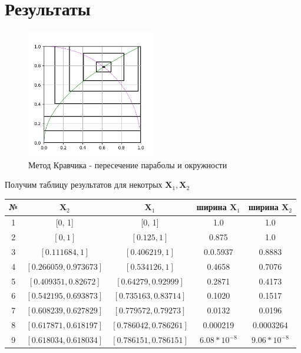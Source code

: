 \documentclass[a4paper,14pt]{article}
\begin{document}
	\section{Результаты}
	\begin{figure}[H] \label{MatrixCorrSet}
		\centering
		\includegraphics[width=0.5\textwidth]{g.png}
		\caption{Метод Кравчика - пересечение параболы и окружности} 
	\end{figure}
	
	Получим таблицу результатов для некотрых $\mathbf{X}_1, \mathbf{X}_2$
	\begin{table}[H]
		\begin{center}
			\begin{tabular}{|c|c|c|c|c|}
				\hline
				№ & $\mathbf{X}_2$ & $\mathbf{X}_1$ & ширина $\mathbf{X}_1$ &  ширина $\mathbf{X}_2$ \\
				\hline
				1   &[0, 1]  & [0, 1] & 1.0 & 1.0 \\
				2   &$[0, 1]$  & $[0.125, 1]$ & 0.875 & 1.0 \\
				3   &$[0.111684, 1] $ & $[0.406219, 1]$ & 0.0.5937 & 0.8883\\
				4   &$[0.266059, 0.973673]$ & $[0.534126, 1]$ & 0.4658 & 0.7076\\
				5   &$[0.409351, 0.82672]$ & $[0.64279, 0.92999] $ & 0.2871 & 0.4173\\
				6   &$[0.542195, 0.693873] $& $[0.735163, 0.83714]$& 0.1020 & 0.1517 \\
				7   &$[0.608239, 0.627829]$ & $[0.779572, 0.79273]$ & 0.0132 & 0.0196\\
				8   &$[0.617871, 0.618197]$ & $[0.786042, 0.786261]$ & 0.000219 & 0.0003264\\
				9   &$[0.618034, 0.618034]$ &$ [0.786151, 0.786151]$ & $6.08*10^{-8}$ &  $9.06*10^{-8}$\\
				\hline
			\end{tabular}
		\end{center}
	\end{table} 
	
\end{document}
